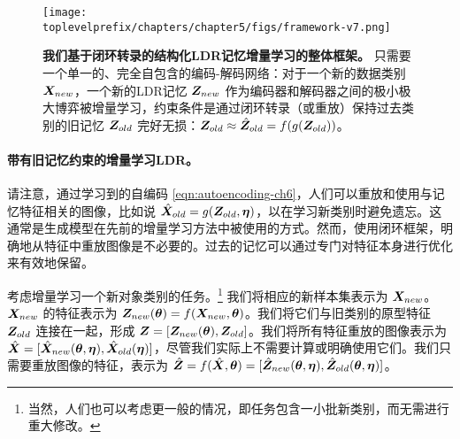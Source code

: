 \documentclass[../../book-main_zh.tex]{subfiles}
\begin{document}
\begin{figure*}[t]
\centering
\texttt{[image: \\toplevelprefix/chapters/chapter5/figs/framework-v7.png]}
\caption{\textbf{我们基于闭环转录的结构化LDR记忆增量学习的整体框架。} 只需要一个单一的、完全自包含的编码-解码网络：对于一个新的数据类别 $\bm{X}_{new}$，一个新的LDR记忆 $\bm{Z}_{new}$ 作为编码器和解码器之间的极小极大博弈被增量学习，约束条件是通过闭环转录（或重放）保持过去类别的旧记忆 $\bm{Z}_{old}$ 完好无损：$\bm{Z}_{old} \approx \hat{\bm{Z}}_{ old} = f(g(\bm{Z}_{ old}))$。
\vspace{-0.2in}}
\label{fig:framework}
\end{figure*}

\paragraph{带有旧记忆约束的增量学习LDR。} 
请注意，通过学习到的自编码 \eqref{eqn:autoencoding-ch6}，人们可以重放和使用与记忆特征相关的图像，比如说 $\hat{\bm{X}}_{old} = g(\bm{Z}_{old}, \bm \eta)$，以在学习新类别时避免遗忘。这通常是生成模型在先前的增量学习方法中被使用的方式。然而，使用闭环框架，明确地从特征中重放图像是不必要的。过去的记忆可以通过专门对特征本身进行优化来有效地保留。

考虑增量学习一个新对象类别的任务。\footnote{当然，人们也可以考虑更一般的情况，即任务包含一小批新类别，而无需进行重大修改。} 我们将相应的新样本集表示为 $\bm{X}_{new}$。$\bm{X}_{new}$ 的特征表示为 $\bm{Z}_{new}(\bm \theta) = f(\bm{X}_{new}, \bm \theta)$。我们将它们与旧类别的原型特征 $\bm{Z}_{old}$ 连接在一起，形成 $\bm{Z} = [\bm{Z}_{new}(\bm \theta), \bm{Z}_{old}]$。我们将所有特征重放的图像表示为 $\hat{\bm{X}} = [{\hat{\bm{X}}_{new}(\bm \theta,\bm \eta)}, {\hat{\bm{X}}_{old}(\bm \eta)}]$，尽管我们实际上不需要计算或明确使用它们。我们只需要重放图像的特征，表示为 $\hat{\bm{Z}} = f(\hat{\bm{X}}, \bm \theta) =  [{\hat{\bm{Z}}_{new}(\bm \theta,\bm \eta)}, {\hat{\bm{Z}}_{old}(\bm \theta,\bm \eta)}]$。
\end{document}
